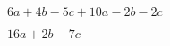 
\question $6a + 4b - 5c + 10a - 2b - 2c$
  \begin{solution}[1cm]
    $16a + 2b - 7c$
  \end{solution}
